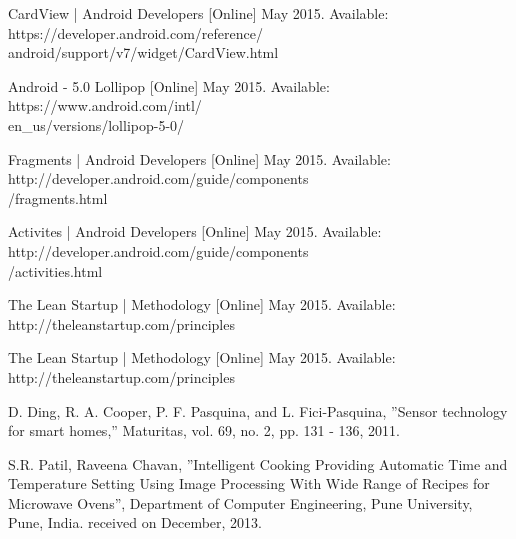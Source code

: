 \begin{thebibliography}{50}

 CardView | Android Developers  [Online] May 2015. Available: https://developer.android.com/reference/\\android/support/v7/widget/CardView.html

 Android - 5.0 Lollipop [Online] May 2015. Available: https://www.android.com/intl/\\en\_us/versions/lollipop-5-0/

 Fragments | Android Developers  [Online] May 2015. Available: http://developer.android.com/guide/components\\/fragments.html

 Activites | Android Developers  [Online] May 2015. Available: http://developer.android.com/guide/components\\/activities.html

 The Lean Startup | Methodology [Online] May 2015. Available: http://theleanstartup.com/principles

 The Lean Startup | Methodology [Online] May 2015. Available:
http://theleanstartup.com/principles

 D. Ding, R. A. Cooper, P. F. Pasquina, and L. Fici-Pasquina, ''Sensor technology for smart homes,'' Maturitas, vol. 69, no. 2, pp. 131 - 136, 2011.

 S.R. Patil, Raveena Chavan, ''Intelligent Cooking Providing Automatic Time and Temperature Setting Using Image Processing With Wide Range of Recipes for Microwave Ovens'', Department of Computer Engineering, Pune University, Pune, India. received on December, 2013.


\end{thebibliography}